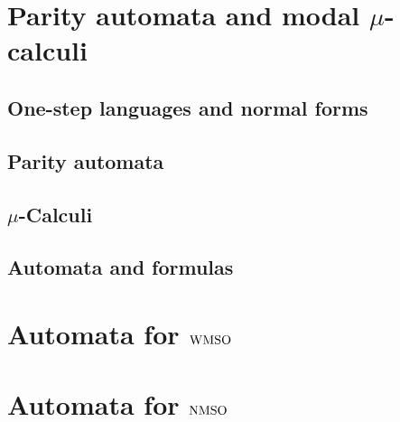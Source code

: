 \documentclass[prodmode,acmtecs]{acmsmall} %
\begin{document}
%

\section{Parity automata and modal $\mu$-calculi}\label{sec:parityaut}


\subsection{One-step languages and normal forms}\label{sec:onestep-short}


\subsection{Parity automata}\label{sec:parityaut}


\subsection{$\mu$-Calculi}\label{sec:onestep-to-mc}


\subsection{Automata and formulas}\label{sec:parity-to-mc}




\clearpage

\section{Automata for $\mathrm{WMSO}$}\label{sec:autwmso}

\clearpage

\section{Automata for $\mathrm{NMSO}$}\label{sec:autnmso}

\clearpage
\end{document}
